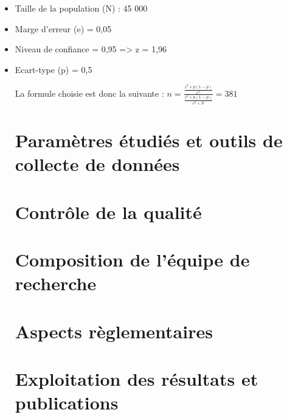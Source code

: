 \begin{itemize}
\item
  Taille de la population (N) : 45 000
\item
  Marge d'erreur (e) = 0,05
\item
  Niveau de confiance = 0,95 \newline
  => z = 1,96
\item 
Ecart-type (p) = 0,5 \newline

La formule choisie est donc la suivante : \begin{math}n = \frac{ \frac{z^2 \times p ( 1 - p )} {e^2}}{\frac{z^2 \times p ( 1 - p )} {e^2 \times N}} = 381\end{math} 

\section{Paramètres étudiés et outils de collecte de données}



\section{Contrôle de la qualité}

\section{Composition de l'équipe de recherche}

\section{Aspects règlementaires}

\section{Exploitation des résultats et publications}
  
\textbf{{\hfill\break
  }}
\end{itemize}